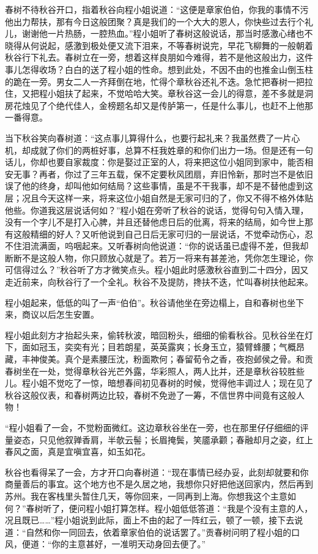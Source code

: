 \documentclass[12pt,UTF8]{ctexbook}
\begin{document}
{{{春树不待秋谷开口，指着秋谷向程小姐说道：“这便是章家伯伯，你我的事情不污他出力帮扶，那有今日这般团聚？真是我们的一个大大的恩人，你快些过去行个礼儿，谢谢他一片热肠，一腔热血。”程小姐听了春树这般说话，那当时感激心绪也不晓得从何说起，感激到极处便又流下泪来，不等春树说完，早花飞柳舞的一般朝着秋谷行下礼去。春树立在一旁，想着这样良朋如今难得，若不是他这般出力，这件事儿怎得收场？白白的送了程小姐的性命。想到此处，不因不由的也推金山倒玉柱的跪在一旁。男女二人一齐拜倒在地，忙得个章秋谷还礼不迭。急忙把春树一把拉住，又把程小姐扶了起来，不觉哈哈大笑。章秋谷这一会儿的得意，差不多就是洞房花烛见了个绝代佳人，金榜题名却又是传胪第一，任是什么事儿，也赶不上他那一番得意。

当下秋谷笑向春树道：“这点事儿算得什么，也要行起礼来？我虽然费了一片心机，却成就了你们的两桩好事，总算不枉我姓章的和你们出力一场。但是还有一句话儿，你却也要自家裁度：你是娶过正室的人，将来把这位小姐同到家中，能否相安无事？再者，你过了三年五载，保不定要秋风团扇，弃旧怜新，那时岂不是依旧误了他的终身，却叫他如何结局？这些事情，虽是不干我事，却不是不替他虚到这层；况且今天这样一来，将来这位小姐自然是无家可归的了，你又不得不格外体贴他些。你道我这层说话何如？”程小姐在旁听了秋谷的说话，觉得句句入情入理，没有一个字儿不是打入心脾，并且还替他虑日后的仳离，将来的结局，如今世上那有这般精细的好人？又听他说到自己日后无家可归的一层说话，不觉牵动伤心，忍不住泪流满面，呜咽起来。又听春树向他说道：“你的说话虽已虚得不差，但我却断断不是这般人物，你只顾放心就是了。若万一将来有甚差池，凭你怎生理论，你可信得过么？”秋谷听了方才微笑点头。程小姐此时感激秋谷直到二十四分，因又走近前来，向秋谷行了一个全礼。秋谷不及提防，搀扶不迭，忙叫春树扶他起来。

程小姐起来，低低的叫了一声“伯伯”。秋谷请他坐在旁边榻上，自和春树也坐下来，商议以后怎生安置。

程小姐此刻方才抬起头来，偷转秋波，暗回粉头，细细的偷看秋谷。见秋谷坐在灯下，面如冠玉，奕奕有光；目若朗星，英英露爽；长身玉立，猿臂蜂腰；气概昂藏，丰神俊美。真个是素腰压沈，粉面欺何；春留荀令之香，夜抱邺侯之骨。和贡春树坐在一处，觉得章秋谷光芒外露，华彩照人，两人比并，还是章秋谷较胜些儿。程小姐不觉吃了一惊，暗想春间初见春树的时候，觉得他丰调过人；现在见了秋谷这般仪表，和春树两边比较，春树不免逊了一筹，不信世界中间竟有这般人物！

“程小姐看了一会，不觉粉面微红。这边章秋谷坐在一旁，也在那里仔仔细细的评量姿态，只见他叙亸香肩，半欹云髻；长眉掩鬓，笑靥承颧；春融却月之姿，红上春风之面，真是宜嗔宜喜，如玉如花。

秋谷也看得呆了一会，方才开口向春树道：“现在事情已经办妥，此刻却就要和你商量善后的事宜。这个地方也不是久居之地，我想你只好把他送回家内，然后再到苏州。我在客栈里头暂住几天，等你回来，一同再到上海。你想我这个主意如何？”春树听了，便问程小姐打算怎样。程小姐低低答道：“我是个没有主意的人，况且既已……”程小姐说到此际，面上不由的起了一阵红云，顿了一顿，接下去说道：“自然和你一同回去，依着章家伯伯的说话罢了。”贡春树问明了程小姐的口风，便道：“你的主意甚好，一准明天动身回去便了。”

}}}
\end{document}
